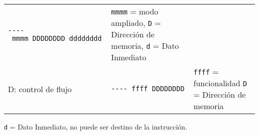 \documentclass[12pt,twoside]{templates/unerthesis}
\begin{document}
\begin{longtable}[]{@{}lll@{}}
\begin{minipage}[t]{0.30\columnwidth}
\texttt{-\/-\/-\/-\ mmmm\ DDDDDDDD\ dddddddd}\strut
\end{minipage} & \begin{minipage}[t]{0.30\columnwidth}\raggedright
\texttt{mmmm} = modo ampliado, \texttt{D} = Dirección de memoria, \texttt{d} = Dato Inmediato\strut
\end{minipage}\tabularnewline
\begin{minipage}[t]{0.30\columnwidth}\raggedright
D: control de flujo\strut
\end{minipage} & \begin{minipage}[t]{0.30\columnwidth}\raggedright
\texttt{-\/-\/-\/-\ ffff\ DDDDDDDD}\strut
\end{minipage} & \begin{minipage}[t]{0.30\columnwidth}\raggedright
\texttt{ffff} = funcionalidad \texttt{D} = Dirección de memoria\strut
\end{minipage}\tabularnewline
\bottomrule
\end{longtable}

\texttt{d} = Dato Inmediato, no puede ser destino de la instrucción.
\end{document}
